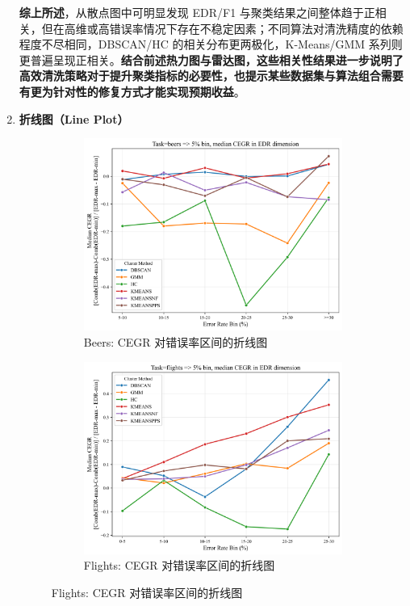 \documentclass[10pt]{article} %
\numberwithin{equation}{section}
\begin{document}
\begin{enumerate}[label=(\alph*)]
\noindent
\textbf{综上所述}，从散点图中可明显发现 EDR/F1 与聚类结果之间整体趋于正相关，但在高维或高错误率情况下存在不稳定因素；不同算法对清洗精度的依赖程度不尽相同，DBSCAN/HC 的相关分布更两极化，K-Means/GMM 系列则更普遍呈现正相关。\textbf{结合前述热力图与雷达图，这些相关性结果进一步说明了高效清洗策略对于提升聚类指标的必要性，也提示某些数据集与算法组合需要有更为针对性的修复方式才能实现预期收益}。  

    \item \textbf{折线图（Line Plot）} \\
\begin{figure}[htbp]
    \centering
    \begin{subfigure}[b]{0.45\linewidth}
        \centering
        \includegraphics[width=\linewidth]{figures/line graph/CEGR_5pct_beers.png}
        \caption{Beers: CEGR 对错误率区间的折线图}
        \label{fig:cegr_beers}
    \end{subfigure}
    \hfill
    \begin{subfigure}[b]{0.45\linewidth}
        \centering
        \includegraphics[width=\linewidth]{figures/line graph/CEGR_5pct_flights.png}
        \caption{Flights: CEGR 对错误率区间的折线图}
        \label{fig:cegr_flights}
    \end{subfigure}
    

\end{figure}
\end{enumerate}
\end{document}
